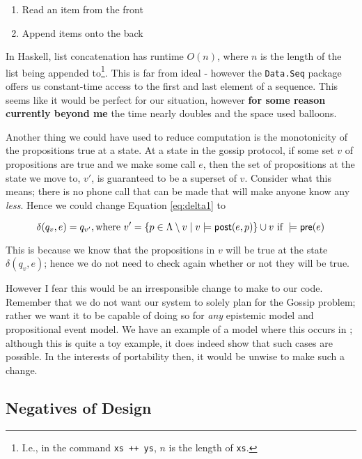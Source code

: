 \documentclass[12pt, a4paper]{article}
\begin{document}
\begin{enumerate}
\item Read an item from the front
\item Append items onto the back
\end{enumerate}

In Haskell, list concatenation has runtime $O(n)$, where $n$ is the length of
the list being appended to\footnote{I.e., in the command \texttt{xs ++ ys}, $n$
  is the length of \texttt{xs}.}. This is far from ideal - however the
\texttt{Data.Seq} package offers us constant-time access to the first and last
element of a sequence. This seems like it would be perfect for our situation,
however \textbf{for some reason currently beyond me} the time nearly doubles and
the space used balloons.

\bigskip

Another thing we could have used to reduce computation is the monotonicity of
the propositions true at a state. At a state in the gossip protocol, if some set
$v$ of propositions are true and we make some call $e$, then the set of
propositions at the state we move to, $v'$, is guaranteed to be a superset of
$v$. Consider what this means; there is no phone call that can be made that will
make anyone know any \textit{less}. Hence we could change Equation
\ref{eq:delta1} to

\begin{equation} \label{eq:delta2}
  \delta(q_v, e) = q_{v'}, \text{where } v' = \{p \in \Lambda \setminus v \mid v \models \textsf{post}(e, p)\} \cup v
  \text{ if } 
  \models \textsf{pre}(e)
\end{equation}

This is because we know that the propositions in $v$ will be true at the state
$\delta(q_v, e)$; hence we do not need to check again whether or not they will
be true. 

However I fear this would be an irresponsible change to make to our code.
Remember that we do not want our system to solely plan for the Gossip problem;
rather we want it to be capable of doing so for \textit{any} epistemic model and
propositional event model. We have an example of a model where this occurs in
; although this is quite a toy example, it does indeed show
that such cases are possible. In the interests of portability then, it would be
unwise to make such a change. 

\subsection{Negatives of Design}




\newpage

\printbibliography[title={Bibliography}]
\end{document}
